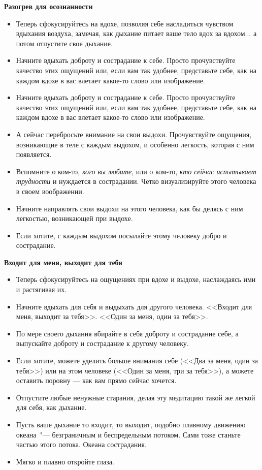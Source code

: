 {\large \textbf{Разогрев для осознанности}}
\begin{itemize}
	\item Теперь сфокусируйтесь на вдохе, позволяя себе насладиться чувством вдыхания воздуха, замечая, как дыхание питает ваше тело вдох за вдохом... а потом отпустите свое дыхание.
	\item Начните вдыхать доброту и сострадание к себе. Просто прочувствуйте качество этих ощущений или, если вам так удобнее, представьте себе, как на каждом вдохе в вас влетает какое-то слово или изображение.
	\item Начните вдыхать доброту и сострадание к себе. Просто прочувствуйте качество этих ощущений или, если вам так удобнее, представьте себе, как на каждом вдохе в вас влетает какое-то слово или изображение.
	\item А сейчас перебросьте внимание на свои выдохи. Прочувствуйте ощущения, возникающие в теле с каждым выдохом, и особенно легкость, которая с ним появляется.
	\item Вспомните о ком-то, \emph{кого вы любите}, или о ком-то, \emph{кто сейчас испытывает трудности} и нуждается в сострадании. Четко визуализируйте этого человека в своем воображении.
	\item Начните направлять свои выдохи на этого человека, как бы делясь с ним легкостью, возникающей при выдохе.
	\item Если хотите, с каждым выдохом посылайте этому человеку добро и сострадание.
\end{itemize}

\vspace{2ex}

{\large \textbf{Входит для меня, выходит для тебя}}
\begin{itemize}
	\item Теперь сфокусируйтесь на ощущениях при вдохе и выдохе, наслаждаясь ими и растягивая их.
	\item Начните вдыхать для себя и выдыхать для другого человека. <<Входит для меня, выходит за тебя>>. <<Один за меня, один за тебя>>.
	\item По мере своего дыхания вбирайте в себя доброту и сострадание себе, а выпускайте доброту и сострадание к другому человеку.
	\item Если хотите, можете уделить больше внимания себе (<<Два за меня, один за тебя>>) или на этом человеке (<<Один за меня, три за тебя>>), а можете оставить поровну — как вам прямо сейчас хочется.
	\item Отпустите любые ненужные старания, делая эту медитацию такой же легкой для себя, как дыхание.
	\item Пусть ваше дыхание то входит, то выходит, подобно плавному движению океана~"--- безграничным и беспредельным потоком. Сами тоже станьте частью этого потока. Океана сострадания.
	\item Мягко и плавно откройте глаза.
\end{itemize}

